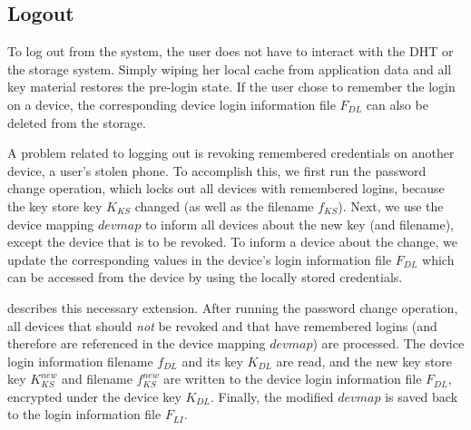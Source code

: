 \subsection{Logout} 

To log out from the system, the user does not have to interact with the DHT or
the storage system.  Simply wiping her local cache from application data and
all key material restores the pre-login state.  If the user chose to
remember the login on a device, the corresponding device login information
file $F_{DL}$ can also be deleted from
the storage. %

A problem related to logging out is revoking remembered credentials on another
device, \eg a user's stolen phone.
To accomplish this, we first run the password change operation, which 
locks out all devices with remembered logins, because the key store key $K_{KS}$
changed (as well as the filename $f_{KS}$).
Next, we use the device mapping $devmap$ to inform all devices about the
new key (and filename), except the device that is to be revoked. To
inform a device about the change, we update the corresponding values in the device's
login information file $F_{DL}$ which can be accessed from the device by using
the locally stored credentials.

 describes this necessary extension.  
After running the password change operation, all devices that should \emph{not} 
be revoked and that have remembered logins (and therefore are 
referenced in the device mapping $devmap$) are processed.
The device login information filename $f_{DL}$ and its key $K_{DL}$ 
are read, and the new key store key $K_{KS}^{new}$ and filename $f_{KS}^{new}$ 
are written to the device login information file $F_{DL}$, encrypted under the 
device key $K_{DL}$. Finally, the modified $devmap$ is saved back to the 
login information file $F_{LI}$.



